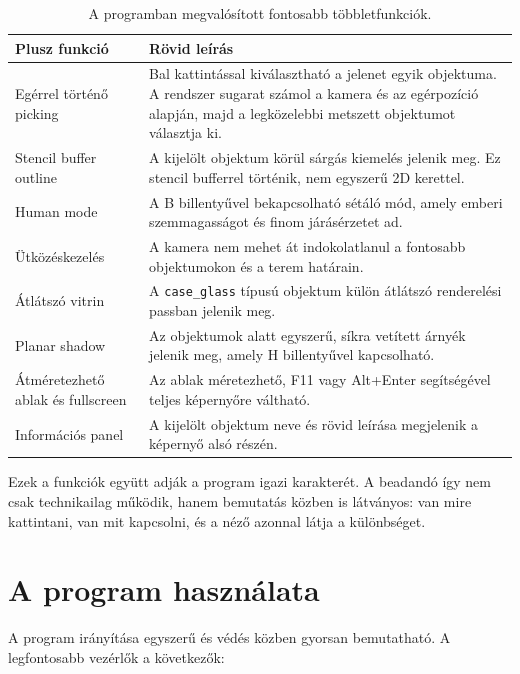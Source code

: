 \documentclass[12pt,a4paper]{article}
\newcommand{\code}[1]{\texttt{#1}}
\begin{document}
\begin{table}[H]
\centering
\begin{tabular}{p{} p{}}
\toprule
\textbf{Plusz funkció} & \textbf{Rövid leírás} \\
\midrule
Egérrel történő picking & Bal kattintással kiválasztható a jelenet egyik objektuma. A rendszer sugarat számol a kamera és az egérpozíció alapján, majd a legközelebbi metszett objektumot választja ki. \\
Stencil buffer outline & A kijelölt objektum körül sárgás kiemelés jelenik meg. Ez stencil bufferrel történik, nem egyszerű 2D kerettel. \\
Human mode & A B billentyűvel bekapcsolható sétáló mód, amely emberi szemmagasságot és finom járásérzetet ad. \\
Ütközéskezelés & A kamera nem mehet át indokolatlanul a fontosabb objektumokon és a terem határain. \\
Átlátszó vitrin & A \code{case\_glass} típusú objektum külön átlátszó renderelési passban jelenik meg. \\
Planar shadow & Az objektumok alatt egyszerű, síkra vetített árnyék jelenik meg, amely H billentyűvel kapcsolható. \\
Átméretezhető ablak és fullscreen & Az ablak méretezhető, F11 vagy Alt+Enter segítségével teljes képernyőre váltható. \\
Információs panel & A kijelölt objektum neve és rövid leírása megjelenik a képernyő alsó részén. \\
\bottomrule
\end{tabular}
\caption{A programban megvalósított fontosabb többletfunkciók.}
\end{table}

Ezek a funkciók együtt adják a program igazi karakterét. A beadandó így nem csak technikailag működik, hanem bemutatás közben is látványos: van mire kattintani, van mit kapcsolni, és a néző azonnal látja a különbséget.

\section{A program használata}

A program irányítása egyszerű és védés közben gyorsan bemutatható. A legfontosabb vezérlők a következők:
\end{document}
